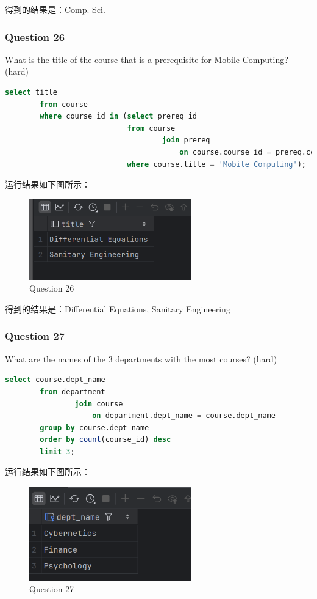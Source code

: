 \documentclass{article}
\begin{document}
    得到的结果是：Comp. Sci.
    
    \subsubsection{Question 26}
    
    What is the title of the course that is a prerequisite for Mobile Computing?  (hard)
    
    \begin{lstlisting}[language=sql, title=Question 26, tabsize=4]
    	select title
    	from course
    	where course_id in (select prereq_id
    					    from course
    								join prereq
    									on course.course_id = prereq.course_id
    						where course.title = 'Mobile Computing');
    \end{lstlisting}
    
    运行结果如下图所示：
    
    \begin{figure}[H]
    	\centering
    	\includegraphics[width=7cm]{./images/30.Question26.png}
    	\caption{Question 26}
    \end{figure}
    
    得到的结果是：Differential Equations, Sanitary Engineering
    
    \subsubsection{Question 27}
    
    What are the names of the 3 departments with the most courses? (hard)
    
    \begin{lstlisting}[language=sql, title=Question 27, tabsize=4]
    	select course.dept_name
    	from department
    			join course
    				on department.dept_name = course.dept_name
    	group by course.dept_name
    	order by count(course_id) desc
    	limit 3;
    \end{lstlisting}
    
    运行结果如下图所示：
    
    \begin{figure}[H]
    	\centering
    	\includegraphics[width=7cm]{./images/31.Question27.png}
    	\caption{Question 27}
    \end{figure}
    
\end{document}
